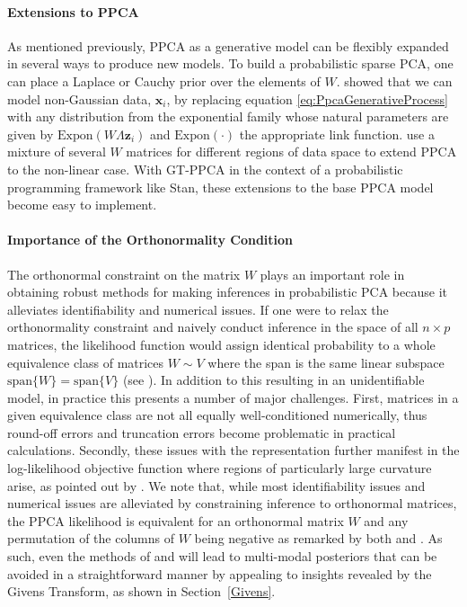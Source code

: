 \documentclass{article}
\newcommand{\mb}[1]{\mathbf{#1}}
\begin{document}
\paragraph{Extensions to PPCA}
As mentioned previously, PPCA as a generative model can be flexibly expanded in several ways to produce new models. To build a probabilistic sparse PCA, one can place a Laplace or Cauchy prior over the elements of $W$. \citet{mohamed2009bayesian} showed that we can model non-Gaussian data, $\mb{x}_i$, by replacing equation \ref{eq:PpcaGenerativeProcess} with any distribution from the exponential family whose natural parameters are given by $\mathrm{Expon}(W\Lambda \mb{z}_i)$ and $\mathrm{Expon}(\cdot)$ the appropriate link function. \citet{ghahramani1996algorithm} use a mixture of several $W$ matrices for different regions of data space to extend PPCA to the non-linear case. With GT-PPCA in the context of a probabilistic programming framework like Stan, these extensions to the base PPCA model become easy to implement.

\paragraph{Importance of the Orthonormality Condition}
The orthonormal constraint on the matrix $W$ plays an important role in obtaining robust methods for making inferences in probabilistic PCA because it alleviates identifiability and numerical issues.  If one were to relax the orthonormality constraint and naively conduct inference in the space of all $n\times p$ matrices, the likelihood function would assign identical probability to a whole equivalence class of matrices $W \sim V$ where the span is the same linear subspace $\mbox{span}\{W\} = \mbox{span}\{V\}$ (see \citet[chapt.~12.1.3]{murphy2012machine}).  In addition to this resulting in an unidentifiable model, in practice this presents a number of major challenges.  First, matrices in a given equivalence class are not all equally well-conditioned numerically, thus round-off errors and truncation errors become problematic in practical calculations.  Secondly, these issues with the representation further manifest in the log-likelihood objective function where regions of particularly large curvature arise, as pointed out by \citep{holbrook2016bayesian}. We note that, while most identifiability issues and numerical issues are alleviated by constraining inference to orthonormal matrices, the PPCA likelihood is equivalent for an orthonormal matrix $W$ and any permutation of the columns of $W$ being negative as remarked by both \citet[chapt.~12.1.3]{murphy2012machine} and  \citet{holbrook2016bayesian}. As such, even the methods of \citet{brubaker2012family} and \citet{byrne2013geodesic} will lead to multi-modal posteriors that can be avoided in a straightforward manner by appealing to insights revealed by the Givens Transform, as shown in Section~\ref{Givens}.
\end{document}
